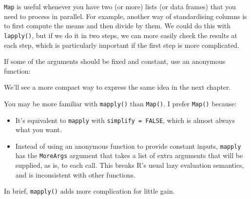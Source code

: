 \texttt{Map} is useful whenever you have two (or more) lists (or data
frames) that you need to process in parallel. For example, another way
of standardising columns is to first compute the means and then divide
by them. We could do this with \texttt{lapply()}, but if we do it in two
steps, we can more easily check the results at each step, which is
particularly important if the first step is more complicated.

\begin{Shaded}
\begin{Highlighting}[]
\StringTok{ }
\StringTok{ }\NormalTok{(}\DataTypeTok{/}

\StringTok{ }\StringTok{ }
\end{Highlighting}
\end{Shaded}

If some of the arguments should be fixed and constant, use an anonymous
function:

\begin{Shaded}
\begin{Highlighting}[]
 
\end{Highlighting}
\end{Shaded}

We'll see a more compact way to express the same idea in the next
chapter.

\begin{shortbox}

You may be more familiar with \texttt{mapply()} than \texttt{Map()}. I
prefer \texttt{Map()} because:

\begin{itemize}
\item
  It's equivalent to \texttt{mapply} with \texttt{simplify = FALSE},
  which is almost always what you want.
\item
  Instead of using an anonymous function to provide constant inputs,
  \texttt{mapply} has the \texttt{MoreArgs} argument that takes a list
  of extra arguments that will be supplied, as is, to each call. This
  breaks R's usual lazy evaluation semantics, and is inconsistent with
  other functions.
\end{itemize}

In brief, \texttt{mapply()} adds more complication for little gain.

\end{shortbox}

